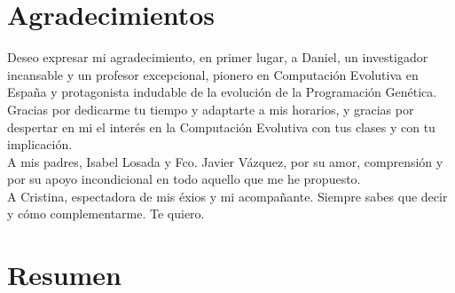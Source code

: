 \documentclass[a4paper,12pt,twoside]{report}
\begin{document}
  \chapter{Agradecimientos}
  Deseo expresar mi agradecimiento, en primer lugar, a Daniel, un investigador incansable y un profesor excepcional, pionero en Computación Evolutiva en España y protagonista indudable de la
  evolución de la Programación Genética. Gracias por dedicarme tu tiempo y adaptarte a mis horarios, y gracias por despertar en mi el interés en la Computación Evolutiva con tus clases y con tu
  implicación.\\[0.5cm]
  A mis padres, Isabel Losada y Fco. Javier Vázquez, por su amor, comprensión y por su apoyo incondicional en todo aquello que me he propuesto.\\[0.5cm]
  A Cristina, espectadora de mis éxios y mi acompañante. Siempre sabes que decir y cómo complementarme. Te quiero.
  \vfill
  \newpage\cleardoublepage
  \chapter{Resumen}
  \lipsum[1-15]
\end{document}
